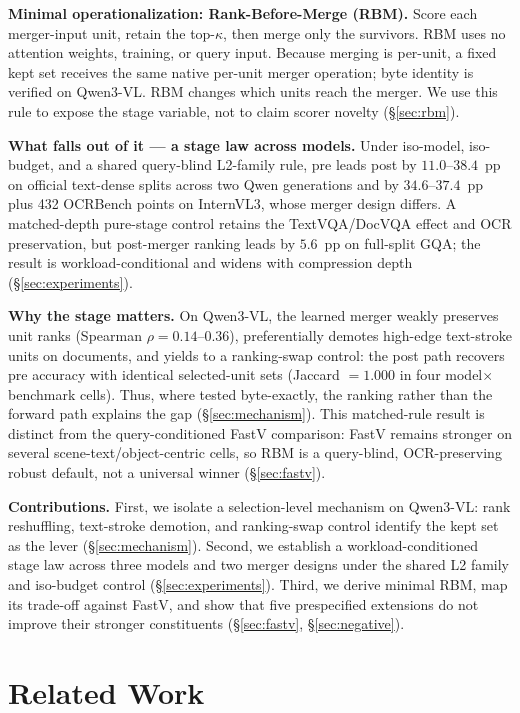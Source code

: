 \documentclass[sigconf,nonacm]{acmart}
\begin{document}
\textbf{Minimal operationalization: Rank-Before-Merge (RBM).} Score each
merger-input unit, retain the top-$\kappa$, then merge only the survivors. RBM
uses no attention weights, training, or query input. Because merging is
per-unit, a fixed kept set receives the same native per-unit merger operation;
byte identity is verified on Qwen3-VL. RBM changes which units reach the merger.
We use this rule to expose the stage variable, not to claim scorer novelty
(\S\ref{sec:rbm}).

\textbf{What falls out of it --- a stage law across models.} Under iso-model,
iso-budget, and a shared query-blind L2-family rule, pre leads post by
$11.0$--$38.4$~pp on
official text-dense splits across two Qwen generations and by
$34.6$--$37.4$~pp plus 432 OCRBench points on InternVL3, whose merger design
differs. A matched-depth pure-stage control retains the TextVQA/DocVQA effect
and OCR preservation, but post-merger ranking leads by $5.6$~pp on full-split
GQA; the result is workload-conditional and widens with compression depth
(\S\ref{sec:experiments}).

\textbf{Why the stage matters.} On Qwen3-VL, the learned merger weakly preserves
unit ranks (Spearman $\rho=0.14$--$0.36$), preferentially demotes high-edge
text-stroke units on documents, and yields to a ranking-swap control: the post
path recovers pre accuracy with identical selected-unit sets (Jaccard $=1.000$
in four model$\times$benchmark cells). Thus, where tested byte-exactly, the
ranking rather than the forward path explains the gap (\S\ref{sec:mechanism}).
This matched-rule result is distinct from the query-conditioned FastV comparison:
FastV remains stronger on several scene-text/object-centric cells, so RBM is a
query-blind, OCR-preserving robust default, not a universal winner
(\S\ref{sec:fastv}).

\textbf{Contributions.}
First, we isolate a selection-level mechanism on Qwen3-VL: rank reshuffling,
text-stroke demotion, and ranking-swap control identify the kept set as the
lever (\S\ref{sec:mechanism}). Second, we establish a workload-conditioned
stage law across three models and two merger designs under the shared L2 family
and iso-budget control (\S\ref{sec:experiments}). Third, we derive minimal RBM,
map its trade-off against FastV, and show that five prespecified extensions do
not improve their stronger constituents (\S\ref{sec:fastv}, \S\ref{sec:negative}).

\section{Related Work}\label{sec:related}
\end{document}
